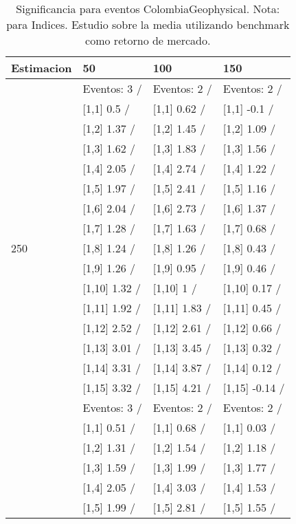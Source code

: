 \begin{table}

\caption{Significancia para eventos ColombiaGeophysical. Nota: para Indices. Estudio sobre la media utilizando benchmark como retorno de mercado.}
\centering
\begin{tabular}[t]{llll}
\toprule
Estimacion & 50 & 100 & 150\\
\midrule
 & Eventos:  3 / & Eventos:  2 / & Eventos:  2 /\\
 & {}[1,1] 0.5  / & {}[1,1] 0.62  / & {}[1,1] -0.1  /\\
 & {}[1,2] 1.37  / & {}[1,2] 1.45  / & {}[1,2] 1.09  /\\
 & {}[1,3] 1.62  / & {}[1,3] 1.83  / & {}[1,3] 1.56  /\\
 & {}[1,4] 2.05  / & {}[1,4] 2.74  / & {}[1,4] 1.22  /\\
\addlinespace
 & {}[1,5] 1.97  / & {}[1,5] 2.41  / & {}[1,5] 1.16  /\\
 & {}[1,6] 2.04  / & {}[1,6] 2.73  / & {}[1,6] 1.37  /\\
 & {}[1,7] 1.28  / & {}[1,7] 1.63  / & {}[1,7] 0.68  /\\
250 & {}[1,8] 1.24  / & {}[1,8] 1.26  / & {}[1,8] 0.43  /\\
 & {}[1,9] 1.26  / & {}[1,9] 0.95  / & {}[1,9] 0.46  /\\
\addlinespace
 & {}[1,10] 1.32  / & {}[1,10] 1  / & {}[1,10] 0.17  /\\
 & {}[1,11] 1.92  / & {}[1,11] 1.83  / & {}[1,11] 0.45  /\\
 & {}[1,12] 2.52  / & {}[1,12] 2.61  / & {}[1,12] 0.66  /\\
 & {}[1,13] 3.01  / & {}[1,13] 3.45  / & {}[1,13] 0.32  /\\
 & {}[1,14] 3.31  / & {}[1,14] 3.87  / & {}[1,14] 0.12  /\\
\addlinespace
 & {}[1,15] 3.32  / & {}[1,15] 4.21  / & {}[1,15] -0.14  /\\
 & Eventos:  3 / & Eventos:  2 / & Eventos:  2 /\\
 & {}[1,1] 0.51  / & {}[1,1] 0.68  / & {}[1,1] 0.03  /\\
 & {}[1,2] 1.31  / & {}[1,2] 1.54  / & {}[1,2] 1.18  /\\
 & {}[1,3] 1.59  / & {}[1,3] 1.99  / & {}[1,3] 1.77  /\\
\addlinespace
 & {}[1,4] 2.05  / & {}[1,4] 3.03  / & {}[1,4] 1.53  /\\
 & {}[1,5] 1.99  / & {}[1,5] 2.81  / & {}[1,5] 1.55  /\\

\end{tabular}
\end{table}
